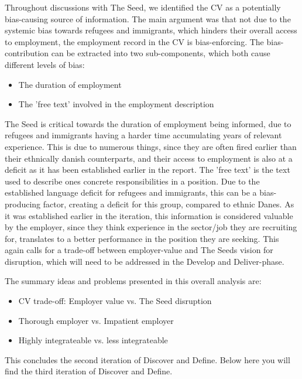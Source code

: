 Throughout discussions with The Seed, we identified the CV as a potentially bias-causing source of information. The main argument was that not due to the systemic bias towards refugees and immigrants, which hinders their overall access to employment, the employment record in the CV is bias-enforcing. The bias-contribution can be extracted into two sub-components, which both cause different levels of bias:

\begin{itemize}
    \item The duration of employment
    \item The 'free text' involved in the employment description
\end{itemize}

\newpage

The Seed is critical towards the duration of employment being informed, due to refugees and immigrants having a harder time accumulating years of relevant experience. This is due to numerous things, since they are often fired earlier than their ethnically danish counterparts, and their access to employment is also at a deficit as it has been established earlier in the report. The 'free text' is the text used to describe ones concrete responsibilities in a position. Due to the established language deficit for refugees and immigrants, this can be a bias-producing factor, creating a deficit for this group, compared to ethnic Danes. As it was established earlier in the iteration, this information is considered valuable by the employer, since they think experience in the sector/job they are recruiting for, translates to a better performance in the position they are seeking. This again calls for a trade-off between employer-value and The Seeds vision for disruption, which will need to be addressed in the Develop and Deliver-phase.

The summary ideas and problems presented in this overall analysis are:

\begin{itemize}
    \item CV trade-off: Employer value vs. The Seed disruption
    \item Thorough employer vs. Impatient employer
    \item Highly integrateable vs. less integrateable
\end{itemize}

This concludes the second iteration of Discover and Define. Below here you will find the third iteration of Discover and Define.


